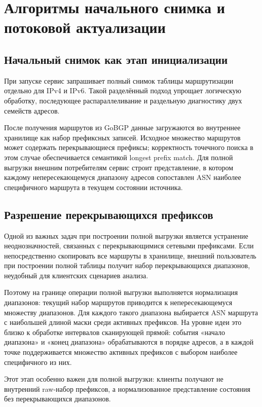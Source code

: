\section{Алгоритмы начального снимка и потоковой актуализации}
\label{sec:snapshot-stream}

\subsection{Начальный снимок как этап инициализации}

При запуске сервис запрашивает полный снимок таблицы маршрутизации
отдельно для IPv4 и IPv6. Такой разделённый подход упрощает логическую
обработку, последующее распараллеливание и раздельную диагностику двух
семейств адресов.

После получения маршрутов из GoBGP данные загружаются во внутреннее
хранилище как набор префиксных записей. Исходное множество маршрутов
может содержать перекрывающиеся префиксы; корректность точечного поиска в
этом случае обеспечивается семантикой longest prefix match. Для полной
выгрузки внешним потребителям сервис строит представление, в котором
каждому непересекающемуся диапазону адресов сопоставлен ASN наиболее
специфичного маршрута в текущем состоянии источника.

\subsection{Разрешение перекрывающихся префиксов}

Одной из важных задач при построении полной выгрузки является устранение
неоднозначностей, связанных с перекрывающимися сетевыми префиксами. Если
непосредственно скопировать все маршруты в хранилище, внешний
пользователь при построении полной таблицы получит набор перекрывающихся
диапазонов, неудобный для клиентских сценариев анализа.

Поэтому на границе операции полной выгрузки выполняется нормализация
диапазонов: текущий набор маршрутов приводится к непересекающемуся
множеству диапазонов. Для каждого такого диапазона выбирается ASN
маршрута с наибольшей длиной маски среди активных префиксов. На уровне
идеи это близко к обработке интервалов сканирующей прямой: события
«начало диапазона» и «конец диапазона» обрабатываются в порядке адресов,
а в каждой точке поддерживается множество активных префиксов с выбором
наиболее специфичного из них.

Этот этап особенно важен для полной выгрузки: клиенты получают не
внутренний raw-набор префиксов, а нормализованное представление
состояния без перекрывающихся диапазонов.

